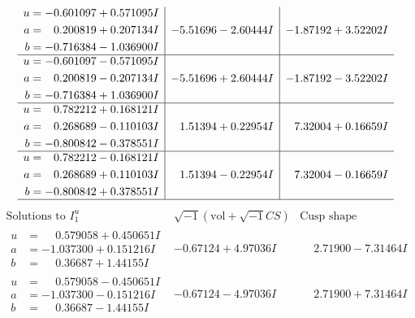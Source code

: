 \documentclass[1p]{elsarticle_modified}
\theoremstyle{definition}
\newcommand{\I}{\sqrt{-1}}
\begin{document}
$$\begin{array}{c|c|c}
\begin{aligned}
u &= -0.601097 + 0.571095 I \\
a &= \phantom{-}0.200819 + 0.207134 I \\
b &= -0.716384 - 1.036900 I\end{aligned}
 & -5.51696 - 2.60444 I & -1.87192 + 3.52202 I \\ \hline\begin{aligned}
u &= -0.601097 - 0.571095 I \\
a &= \phantom{-}0.200819 - 0.207134 I \\
b &= -0.716384 + 1.036900 I\end{aligned}
 & -5.51696 + 2.60444 I & -1.87192 - 3.52202 I \\ \hline\begin{aligned}
u &= \phantom{-}0.782212 + 0.168121 I \\
a &= \phantom{-}0.268689 - 0.110103 I \\
b &= -0.800842 - 0.378551 I\end{aligned}
 & \phantom{-}1.51394 + 0.22954 I & \phantom{-}7.32004 + 0.16659 I \\ \hline\begin{aligned}
u &= \phantom{-}0.782212 - 0.168121 I \\
a &= \phantom{-}0.268689 + 0.110103 I \\
b &= -0.800842 + 0.378551 I\end{aligned}
 & \phantom{-}1.51394 - 0.22954 I & \phantom{-}7.32004 - 0.16659 I\\
 \hline 
 \end{array}$$\newpage$$\begin{array}{c|c|c}  
\text{Solutions to }I^u_{1}& \I (\text{vol} + \sqrt{-1}CS) & \text{Cusp shape}\\
 \hline 
\begin{aligned}
u &= \phantom{-}0.579058 + 0.450651 I \\
a &= -1.037300 + 0.151216 I \\
b &= \phantom{-}0.36687 + 1.44155 I\end{aligned}
 & -0.67124 + 4.97036 I & \phantom{-}2.71900 - 7.31464 I \\ \hline\begin{aligned}
u &= \phantom{-}0.579058 - 0.450651 I \\
a &= -1.037300 - 0.151216 I \\
b &= \phantom{-}0.36687 - 1.44155 I\end{aligned}
 & -0.67124 - 4.97036 I & \phantom{-}2.71900 + 7.31464 I \\ \hline\begin{aligned}

\end{aligned}
\end{array}$$
\end{document}
